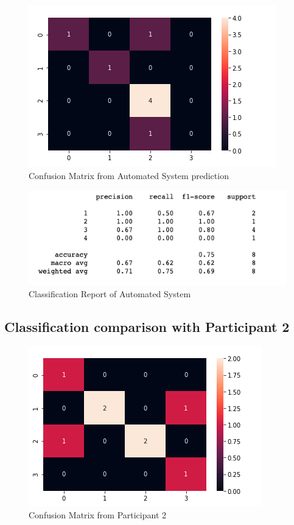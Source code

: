 \begin{figure}[!htp]
    \includegraphics[width=\textwidth]{Images/a1.png}
    \caption{Confusion Matrix from Automated System prediction}
    \label{fig:f11}
\end{figure}

\begin{figure}[!htp]
    \includegraphics[width=\textwidth]{Images/a1r.png}
    \caption{Classification Report of Automated System}
    \label{fig:f11}
\end{figure}



\pagebreak
\subsection*{Classification comparison with Participant 2 }

\begin{figure}[!htp]
    \includegraphics[width=\textwidth]{Images/p2.png}
    \caption{Confusion Matrix from Participant 2}
    \label{fig:f11}
\end{figure}

